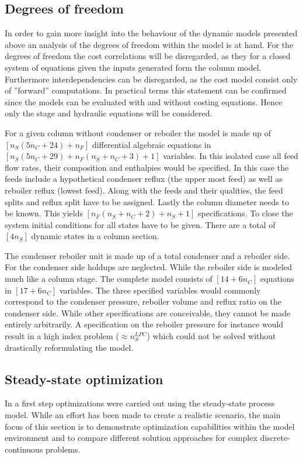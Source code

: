    \subsection{Degrees of freedom}
    In order to gain more insight into the behaviour of the dynamic models presented above an analysis
    of the degrees of freedom within the model is at hand. For the degrees of freedom the cost correlations
    will be disregarded, as they for a closed system of equations given the inputs generated form the column
    model. Furthermore interdependencies can be disregarded, as the cost model consist only of ''forward''
    computations. In practical terms this statement can be confirmed since the models can be evaluated
    with and without costing equations. Hence only the stage and hydraulic equations will be considered.

    For a given column without condenser or reboiler the model is made up of $[n_S (5n_C + 24) + n_F]$
    differential algebraic equations in $[n_S (5n_C + 29) + n_F (n_S + n_C + 3) + 1]$ variables. In this
    isolated case all feed flow rates, their composition and enthalpies would be specified. In this case
    the feeds include a hypothetical condenser reflux (the upper most feed) as well as reboiler reflux
    (lowest feed). Along with the feeds and their qualities, the feed splits and reflux split have to be
    assigned. Lastly the column diameter needs to be known. This yields $[n_F (n_S + n_C + 2) + n_S + 1]$
    specifications. To close the system initial conditions for all states have to be given. There
    are a total of $[4 n_S ]$ dynamic states in a column section.

    The condenser reboiler unit is made up of a total condenser and a reboiler side. For the condenser side 
    holdups are neglected. While the reboiler side is modeled much like a column stage. The complete model 
    consists of $[14 + 6 n_C]$ equations in $[17 + 6 n_C]$ variables. The three specified variables would 
    commonly correspond to the condenser pressure, reboiler volume and reflux ratio on the condenser side.
    While other specifications are conceivable, they cannot be made entirely arbitrarily. A specification 
    on the reboiler pressure for instance would result in a high index problem ($\approx n_S^{LPC}$) which 
    could not be solved without drastically reformulating the model.

    \subsection{Steady-state optimization}
    In a first step optimizations were carried out using the steady-state process model. While an effort
    has been made to create a realistic scenario, the main focus of this section is to demonstrate
    optimization capabilities within the model environment \gproms and to compare different solution
    approaches for complex discrete-continuous problems.

